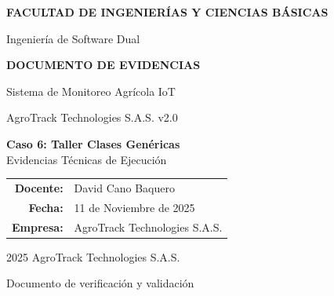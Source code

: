\documentclass[12pt,a4paper]{article}
\begin{document}

\begin{titlepage}
    \centering
    \vspace*{2cm}
    
    {\LARGE\bfseries FACULTAD DE INGENIERÍAS Y CIENCIAS BÁSICAS\par}
    \vspace{0.5cm}
    {\Large Ingeniería de Software Dual\par}
    \vspace{2cm}
    
    {\Huge\bfseries\color{evidenceblue} DOCUMENTO DE EVIDENCIAS\par}
    \vspace{0.5cm}
    {\huge Sistema de Monitoreo Agrícola IoT\par}
    \vspace{0.3cm}
    {\LARGE AgroTrack Technologies S.A.S. v2.0\par}
    \vspace{2cm}
    
    \begin{tcolorbox}[colback=evidenceblue!10,colframe=evidenceblue,width=0.8\textwidth]
        \centering
        {\Large\bfseries Caso 6: Taller Clases Genéricas}\\
        \vspace{0.3cm}
        {\large Evidencias Técnicas de Ejecución}
    \end{tcolorbox}
    
    \vspace{2cm}
    
    \begin{tabular}{rl}
        \textbf{Docente:} & David Cano Baquero \\
        \textbf{Fecha:} & 11 de Noviembre de 2025 \\
        \textbf{Empresa:} & AgroTrack Technologies S.A.S. \\
    \end{tabular}
    
    \vfill
    
    {\large\textcopyright{} 2025 AgroTrack Technologies S.A.S.\par}
    {\small Documento de verificación y validación\par}
\end{titlepage}

\setcounter{page}{1}
\end{document}

